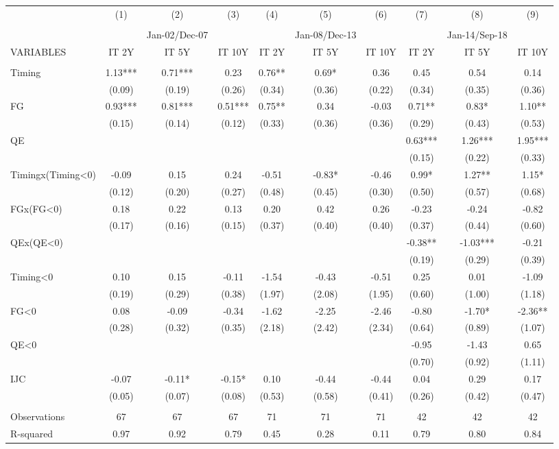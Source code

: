 \begin{tabular}{lccccccccc} \hline
 & (1) & (2) & (3) & (4) & (5) & (6) & (7) & (8) & (9) \\
 &  &  &  &  &  &  &  &  &  \\
 &  & Jan-02/Dec-07 &  &  & Jan-08/Dec-13 &  &  & Jan-14/Sep-18 &  \\
VARIABLES & IT 2Y & IT 5Y & IT 10Y & IT 2Y & IT 5Y & IT 10Y & IT 2Y & IT 5Y & IT 10Y \\ \hline
 &  &  &  &  &  &  &  &  &  \\
Timing & 1.13*** & 0.71*** & 0.23 & 0.76** & 0.69* & 0.36 & 0.45 & 0.54 & 0.14 \\
 & (0.09) & (0.19) & (0.26) & (0.34) & (0.36) & (0.22) & (0.34) & (0.35) & (0.36) \\
FG & 0.93*** & 0.81*** & 0.51*** & 0.75** & 0.34 & -0.03 & 0.71** & 0.83* & 1.10** \\
 & (0.15) & (0.14) & (0.12) & (0.33) & (0.36) & (0.36) & (0.29) & (0.43) & (0.53) \\
QE &  &  &  &  &  &  & 0.63*** & 1.26*** & 1.95*** \\
 &  &  &  &  &  &  & (0.15) & (0.22) & (0.33) \\
Timingx(Timing<0) & -0.09 & 0.15 & 0.24 & -0.51 & -0.83* & -0.46 & 0.99* & 1.27** & 1.15* \\
 & (0.12) & (0.20) & (0.27) & (0.48) & (0.45) & (0.30) & (0.50) & (0.57) & (0.68) \\
FGx(FG<0) & 0.18 & 0.22 & 0.13 & 0.20 & 0.42 & 0.26 & -0.23 & -0.24 & -0.82 \\
 & (0.17) & (0.16) & (0.15) & (0.37) & (0.40) & (0.40) & (0.37) & (0.44) & (0.60) \\
QEx(QE<0) &  &  &  &  &  &  & -0.38** & -1.03*** & -0.21 \\
 &  &  &  &  &  &  & (0.19) & (0.29) & (0.39) \\
Timing<0 & 0.10 & 0.15 & -0.11 & -1.54 & -0.43 & -0.51 & 0.25 & 0.01 & -1.09 \\
 & (0.19) & (0.29) & (0.38) & (1.97) & (2.08) & (1.95) & (0.60) & (1.00) & (1.18) \\
FG<0 & 0.08 & -0.09 & -0.34 & -1.62 & -2.25 & -2.46 & -0.80 & -1.70* & -2.36** \\
 & (0.28) & (0.32) & (0.35) & (2.18) & (2.42) & (2.34) & (0.64) & (0.89) & (1.07) \\
QE<0 &  &  &  &  &  &  & -0.95 & -1.43 & 0.65 \\
 &  &  &  &  &  &  & (0.70) & (0.92) & (1.11) \\
IJC & -0.07 & -0.11* & -0.15* & 0.10 & -0.44 & -0.44 & 0.04 & 0.29 & 0.17 \\
 & (0.05) & (0.07) & (0.08) & (0.53) & (0.58) & (0.41) & (0.26) & (0.42) & (0.47) \\
 &  &  &  &  &  &  &  &  &  \\
Observations & 67 & 67 & 67 & 71 & 71 & 71 & 42 & 42 & 42 \\
 R-squared & 0.97 & 0.92 & 0.79 & 0.45 & 0.28 & 0.11 & 0.79 & 0.80 & 0.84 \\ \hline
\end{tabular}

